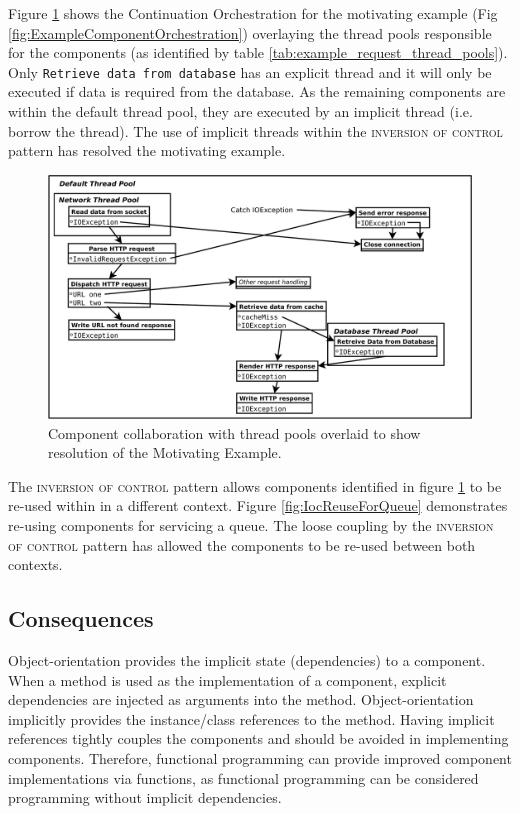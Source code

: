 \documentclass[prodmode]{style/acmlarge}
\begin{document}
Figure \ref{fig:IocMotivatingExampleResolved} shows the Continuation
Orchestration for the motivating example (Fig
\ref{fig:ExampleComponentOrchestration}) overlaying the thread pools responsible
for the components (as identified by table
\ref{tab:example_request_thread_pools}).  Only \texttt{Retrieve data from
database} has an explicit thread and it will only be executed if data is
required from the database.  As the remaining components are within the default
thread pool, they are executed by an implicit thread (i.e. borrow the thread).
The use of implicit threads within the \textsc{inversion of control} pattern has
resolved the motivating example.

\begin{figure}[t]
\centering
\includegraphics[width=4.5in]{IocMotivatingExampleResolved}
\caption{Component collaboration with thread pools overlaid to show resolution of the Motivating Example.}
\label{fig:IocMotivatingExampleResolved}
\end{figure}

The \textsc{inversion of control} pattern allows components identified in figure
\ref{fig:IocMotivatingExampleResolved} to be re-used within in a different
context. Figure \ref{fig:IocReuseForQueue} demonstrates re-using components for
servicing a queue.  The loose coupling by the \textsc{inversion of control}
pattern has allowed the components to be re-used between both contexts.


\subsection{Consequences}

Object-orientation provides the implicit state (dependencies) to a component.
When a method is used as the implementation of a component, explicit
dependencies are injected as arguments into the method.  Object-orientation
implicitly provides the instance/class references to the method.  Having
implicit references tightly couples the components and should be avoided in
implementing components.  Therefore, functional programming can provide improved
component implementations via functions, as functional programming can be
considered programming without implicit dependencies.
\end{document}
